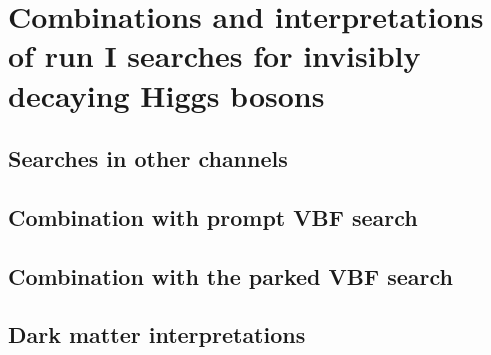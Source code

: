 \chapter{Combinations and interpretations of run I searches for invisibly decaying Higgs bosons}
\label{chap:comb}

\section{Searches in other channels}

\section{Combination with prompt VBF search}

\section{Combination with the parked VBF search}

\section{Dark matter interpretations}
